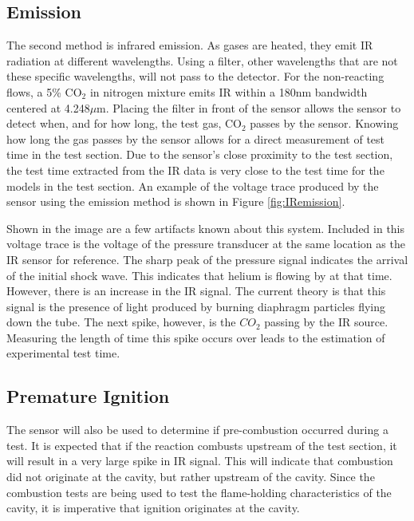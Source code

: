 
\subsection{Emission}

The second method is infrared emission. As gases are heated, they emit IR radiation at different wavelengths. Using a filter, other wavelengths that are not these specific wavelengths, will not pass to the detector. For the non-reacting flows, a 5\% CO$_2$ in nitrogen mixture emits IR within a 180nm bandwidth centered at 4.248$\mu$m. Placing the filter in front of the sensor allows the sensor to detect when, and for how long, the test gas, CO$_2$ passes by the sensor. Knowing how long the gas passes by the sensor allows for a direct measurement of test time in the test section. Due to the sensor's close proximity to the test section, the test time extracted from the IR data is very close to the test time for the models in the test section. An example of the voltage trace produced by the sensor using the emission method is shown in Figure \ref{fig:IRemission}. 

Shown in the image are a few artifacts known about this system. Included in this voltage trace is the voltage of the pressure transducer at the same location as the IR sensor for reference. The sharp peak of the pressure signal indicates the arrival of the initial shock wave. This indicates that helium is flowing by at that time. However, there is an increase in the IR signal. The current theory is that this signal is the presence of light produced by burning diaphragm particles flying down the tube. The next spike, however, is the $CO_2$ passing by the IR source. Measuring the length of time this spike occurs over leads to the estimation of experimental test time. 

\subsection{Premature Ignition}

The sensor will also be used to determine if pre-combustion occurred during a test. It is expected that if the reaction combusts upstream of the test section, it will result in a very large spike in IR signal. This will indicate that combustion did not originate at the cavity, but rather upstream of the cavity. Since the combustion tests are being used to test the flame-holding characteristics of the cavity, it is imperative that ignition originates at the cavity. 


